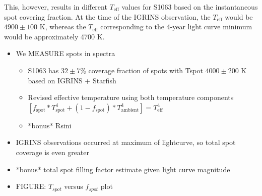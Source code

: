 \documentclass[twocolumn]{emulateapj}%
\begin{document}
This, however, results in different $T_{\textrm{eff}}$ values for S1063 based on the instantaneous spot covering fraction. At the time of the IGRINS observation, the $T_{\textrm{eff}}$ would be $4900\pm100$ K, whereas the $T_{\textrm{eff}}$ corresponding to the 4-year light curve minimum would be approximately 4700 K.



\begin{itemize}
\item We MEASURE spots in spectra
\begin{itemize}
  \item S1063 has $32 \pm 7$\% coverage fraction of spots with Tspot $4000\pm200$ K based on IGRINS + Starfish
  \item Revised effective temperature using both temperature components $[f_{\textrm{spot}} * T_{\textrm{spot}}^4 + (1 -f_{\textrm{spot}}) * T_{\textrm{ambient}}^4] = T_{\textrm{eff}}^4$

  \item *bonus* Rsini
\end{itemize}
\item IGRINS observations occurred at maximum of lightcurve, so total spot coverage is even greater
\item *bonus* total spot filling factor estimate given light curve magnitude
\item FIGURE: $T_{spot}$ versus $f_{spot}$ plot



\end{itemize}
\end{document}
